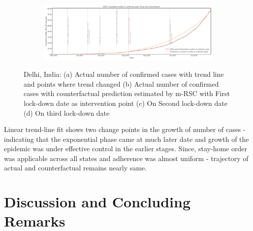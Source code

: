 \documentclass[preprint,authoryear,12pt]{elsarticle}
\begin{document}
\begin{figure}
		\begin{subfigure}[b]{\textwidth}
			\centering
			\includegraphics[width=0.8\linewidth,height=0.18\textheight]{Delhi_confirmed cases-L3-CUM}
		\end{subfigure}
		
		\caption[Delhi]{Delhi, India: (a) Actual number of confirmed cases with  trend line and points where trend changed (b) Actual number of confirmed cases with counterfactual prediction estimated by m-RSC with First lock-down date as intervention point (c) On Second lock-down date (d) On third  lock-down date}
		\label{fig7} 
	\end{figure}
	
	Linear trend-line fit shows two change points in the growth of number of cases - indicating that the exponential phase came at much later date and growth of the epidemic was under effective control in the earlier stages. Since, stay-home order was applicable across all states and adherence was almost uniform -  trajectory of actual and counterfactual remains nearly same.
	
	\section{Discussion and Concluding Remarks}
	\label{SEC5}
	
	
	
		
\end{document}
